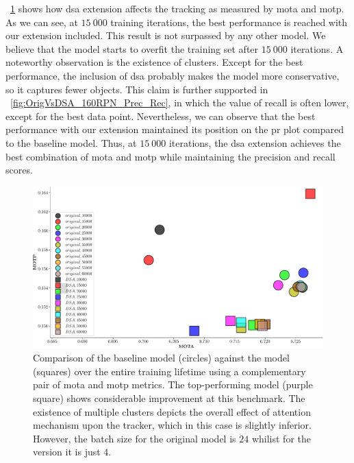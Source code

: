 \figtext{}~\ref{fig:OrigVsDSA_160RPN_MOTA_MOTP} shows how \gls{dsa} extension affects the tracking as measured by \gls{mota} and \gls{motp}. As we can see, at $15\ 000$ training iterations, the best performance is reached with our extension included. This result is not surpassed by any other model. We believe that the model starts to overfit the training set after $15\ 000$ iterations. A noteworthy observation is the existence of clusters. Except for the best performance, the inclusion of \gls{dsa} probably makes the model more conservative, so it captures fewer objects. This claim is further supported in \figtext{}~\ref{fig:OrigVsDSA_160RPN_Prec_Rec}, in which the value of recall is often lower, except for the best data point. Nevertheless, we can observe that the best performance with our extension maintained its position on the \gls{pr} plot compared to the baseline model. Thus, at $15\ 000$ iterations, the \gls{dsa} extension achieves the best combination of \gls{mota} and \gls{motp} while maintaining the precision and recall scores.

\begin{figure}[t]
  \centerline{\includegraphics[width=\linewidth]{figures/siamese_tracking/tracker_cmp_160_2x12_vs_160_2x2_DSA_MOTA_MOTP.pdf}}
  \caption[\gls{dsa} evaluation - primary metrics]{Comparison of the baseline model (circles) against the \dsamodel{} model (squares) over the entire training lifetime using a complementary pair of \gls{mota} and \gls{motp} metrics. The top-performing \dsamodel{} model (purple square) shows considerable improvement at this benchmark. The existence of multiple clusters depicts the overall effect of attention mechanism upon the tracker, which in this case is slightly inferior. However, the batch size for the original model is $24$ whilist for the \dsamodel{} version it is just $4$.}
  \label{fig:OrigVsDSA_160RPN_MOTA_MOTP}
\end{figure}

